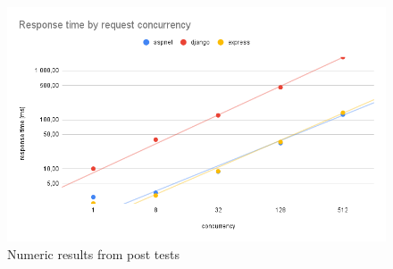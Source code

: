 \begin{figure}[H]
    \includegraphics[width=\columnwidth]{figures/pictures/resultsPost.png}
    \caption{Numeric results from post tests}
    \label{fig:resultsPost}
\end{figure}
